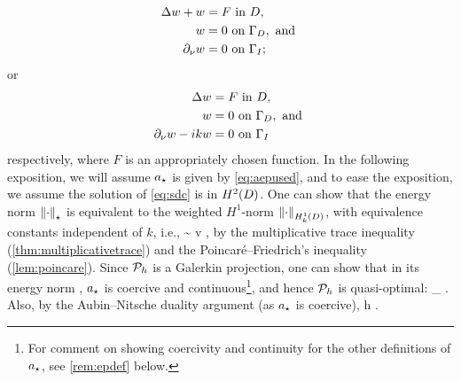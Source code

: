 \begin{subequations}
    \label{eq:sdb}
\begin{align}
  \Delta w + w&= F \text{ in } D,\label{eq:sd4}\\
  w &= 0 \text{ on } \Gamma_{D},\text{ and }\label{eq:sd5}\\
  \partial_{\nu} w &= 0 \text{ on } \Gamma_{I};\label{eq:sd6}
\end{align}
\end{subequations}
or
\begin{subequations}
    \label{eq:sdc}
\begin{align}
  \Delta w &= F \text{ in } D,\label{eq:sd7}\\
  w &= 0 \text{ on } \Gamma_{D},\text{ and }\label{eq:sd8}\\
  \partial_{\nu} w -ikw &= 0 \text{ on } \Gamma_{I}\label{eq:sd9}
\end{align}
\end{subequations}
respectively, where $F$ is an appropriately chosen function. In the following exposition, we will assume $a_{\star}$ is given by \cref{eq:aepused}, and to ease the exposition, we assume the solution of \cref{eq:sdc} is in $\HtD$. One can show that the energy norm $\Nep{\cdot}$ is equivalent to the weighted $H^1$-norm $\NHokD{\cdot}$, with equivalence constants independent of $k$, i.e.,
\beq\label{eq:aepnormequiv}
 \sim {} \tforall v \in \HozDD,
\eeq
by the multiplicative trace inequality (\cref{thm:multiplicativetrace}) and the Poincar\'e--Friedrich's inequality (\cref{lem:poincare}). Since $\mathcal P_{h}$ is a Galerkin projection, one can show that in its energy norm , $a_{\star}$ is coercive and continuous\footnote{For comment on showing coercivity and continuity for the other definitions of $a_{\star}$, see \cref{rem:epdef} below.}, and hence $\mathcal P_{h}$ is quasi-optimal:
\beq\label{eq:epho}
 \lesssim \inf_{\vh \in \Vhp} .
\eeq
Also, by the Aubin--Nitsche duality argument (as $a_{\star}$ is coercive),
\beq\label{eq:eplt}
 \lesssim h .
\eeq

